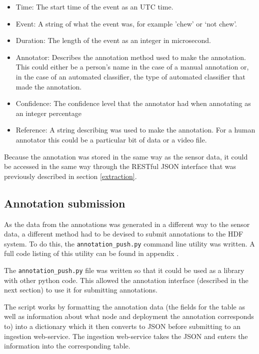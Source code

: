 \begin{itemize}
\item Time: The start time of the event as an UTC time.

\item Event: A string of what the event was, for example 'chew' or `not chew'.

\item Duration: The length of the event as an integer in microsecond.

\item Annotator: Describes the annotation method used to make the annotation. This could either be a person's name in the case of a manual annotation or, in the case of an automated classifier, the type of automated classifier that made the annotation.

\item Confidence: The confidence level that the annotator had when annotating as an integer percentage

\item Reference: A string describing was used to make the annotation. For a human annotator this could be a particular bit of data or a video file. 
\end{itemize}

Because the annotation was stored in the same way as the sensor data, it could be accessed in the same way through the RESTful JSON interface that was previously described in section \ref{extraction}. 

\subsection{Annotation submission}
As the data from the annotations was generated in a different way to the sensor data, a different method had to be devised to submit annotations to the HDF system. To do this, the \texttt{annotation\_push.py} command line utility was written. A full code listing of this utility can be found in appendix \label{appendixannotationpush}.

The \texttt{annotation\_push.py} file was written so that it could be used as a library with other python code. This allowed the annotation interface (described in the next section) to use it for submitting annotations. 

The script works by formatting the annotation data (the fields for the table as well as information about what node and deployment the annotation corresponds to) into a dictionary which it then converts to JSON before submitting to an ingestion web-service. The ingestion web-service takes the JSON and enters the information into the corresponding table. 

